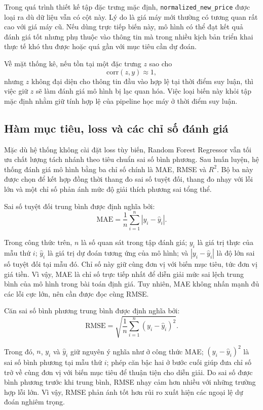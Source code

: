 Trong quá trình thiết kế tập đặc trưng mặc định, \texttt{normalized\_new\_price} được loại ra dù dữ liệu vẫn có cột này. Lý do là giá máy mới thường có tương quan rất cao với giá máy cũ. Nếu dùng trực tiếp biến này, mô hình có thể đạt kết quả đánh giá tốt nhưng phụ thuộc vào thông tin mà trong nhiều kịch bản triển khai thực tế khó thu được hoặc quá gần với mục tiêu cần dự đoán.

Về mặt thống kê, nếu tồn tại một đặc trưng $z$ sao cho
$$
\mathrm{corr}(z, y) \approx 1,
$$
nhưng $z$ không đại diện cho thông tin đầu vào hợp lệ tại thời điểm suy luận, thì việc giữ $z$ sẽ làm đánh giá mô hình bị lạc quan hóa. Việc loại biến này khỏi tập mặc định nhằm giữ tính hợp lệ của pipeline học máy ở thời điểm suy luận.

\subsection{Hàm mục tiêu, loss và các chỉ số đánh giá}

Mặc dù hệ thống không cài đặt loss tùy biến, Random Forest Regressor vẫn tối ưu chất lượng tách nhánh theo tiêu chuẩn sai số bình phương. Sau huấn luyện, hệ thống đánh giá mô hình bằng ba chỉ số chính là MAE, RMSE và $R^2$. Bộ ba này được chọn để kết hợp đồng thời thang đo sai số tuyệt đối, thang đo nhạy với lỗi lớn và một chỉ số phản ánh mức độ giải thích phương sai tổng thể.

Sai số tuyệt đối trung bình được định nghĩa bởi:
$$
\mathrm{MAE} = \frac{1}{n}\sum_{i=1}^{n} |y_i - \hat{y}_i|.
$$

Trong công thức trên, $n$ là số quan sát trong tập đánh giá; $y_i$ là giá trị thực của mẫu thứ $i$; $\hat{y}_i$ là giá trị dự đoán tương ứng của mô hình; và $|y_i-\hat{y}_i|$ là độ lớn sai số tuyệt đối tại mẫu đó. Chỉ số này giữ cùng đơn vị với biến mục tiêu, tức đơn vị giá tiền. Vì vậy, MAE là chỉ số trực tiếp nhất để diễn giải mức sai lệch trung bình của mô hình trong bài toán định giá. Tuy nhiên, MAE không nhấn mạnh đủ các lỗi cực lớn, nên cần được đọc cùng RMSE.

Căn sai số bình phương trung bình được định nghĩa bởi:
$$
\mathrm{RMSE} = \sqrt{\frac{1}{n}\sum_{i=1}^{n}(y_i - \hat{y}_i)^2}.
$$

Trong đó, $n$, $y_i$ và $\hat{y}_i$ giữ nguyên ý nghĩa như ở công thức MAE; $(y_i-\hat{y}_i)^2$ là sai số bình phương tại mẫu thứ $i$; phép căn bậc hai ở bước cuối giúp đưa chỉ số trở về cùng đơn vị với biến mục tiêu để thuận tiện cho diễn giải. Do sai số được bình phương trước khi trung bình, RMSE nhạy cảm hơn nhiều với những trường hợp lỗi lớn. Vì vậy, RMSE phản ánh tốt hơn rủi ro xuất hiện các ngoại lệ dự đoán nghiêm trọng.

